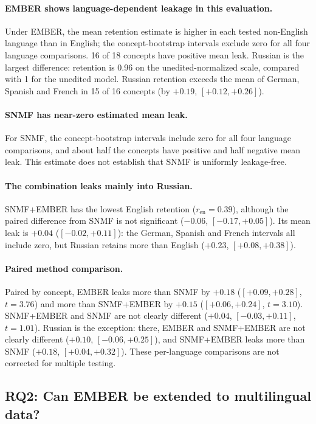 \documentclass[11pt]{article}
\begin{document}
\paragraph{EMBER shows language-dependent leakage in this evaluation.}
Under EMBER, the mean retention estimate is higher in each tested non-English language than in English; the concept-bootstrap intervals exclude zero for all four language comparisons.
16 of 18 concepts have positive mean leak.
Russian is the largest difference: retention is 0.96 on the unedited-normalized scale, compared with 1 for the unedited model.
Russian retention exceeds the mean of German, Spanish and French in 15 of 16 concepts (by $+0.19$, $[+0.12,+0.26]$).

\paragraph{SNMF has near-zero estimated mean leak.}
For SNMF, the concept-bootstrap intervals include zero for all four language comparisons, and about half the concepts have positive and half negative mean leak.
This estimate does not establish that SNMF is uniformly leakage-free.

\paragraph{The combination leaks mainly into Russian.}
SNMF+EMBER has the lowest English retention ($r_{\text{en}}=0.39$), although the paired difference from SNMF is not significant ($-0.06$, $[-0.17,+0.05]$).
Its mean leak is $+0.04$ ($[-0.02,+0.11]$): the German, Spanish and French intervals all include zero, but Russian retains more than English ($+0.23$, $[+0.08,+0.38]$).

\paragraph{Paired method comparison.}
Paired by concept, EMBER leaks more than SNMF by $+0.18$ ($[+0.09,+0.28]$, $t=3.76$) and more than SNMF+EMBER by $+0.15$ ($[+0.06,+0.24]$, $t=3.10$).
SNMF+EMBER and SNMF are not clearly different ($+0.04$, $[-0.03,+0.11]$, $t=1.01$).
Russian is the exception: there, EMBER and SNMF+EMBER are not clearly different ($+0.10$, $[-0.06,+0.25]$), and SNMF+EMBER leaks more than SNMF ($+0.18$, $[+0.04,+0.32]$).
These per-language comparisons are not corrected for multiple testing.

\subsection{RQ2: Can EMBER be extended to multilingual data?}
\label{sec:mechanism}
\end{document}
